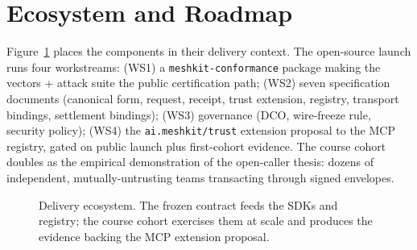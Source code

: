 \documentclass[10pt,twocolumn]{article}
\newcommand{\field}[1]{\texttt{#1}}
\begin{document}
\section{Ecosystem and Roadmap}

Figure~\ref{fig:ecosystem} places the components in their delivery
context. The open-source launch runs four workstreams: (WS1) a
\field{meshkit-conformance} package making the vectors + attack suite the
public certification path; (WS2) seven specification documents (canonical
form, request, receipt, trust extension, registry, transport bindings,
settlement bindings);
(WS3) governance (DCO, wire-freeze rule, security policy); (WS4) the
\field{ai.meshkit/trust} extension proposal to the MCP registry, gated on
public launch plus first-cohort evidence. The course cohort doubles as the
empirical demonstration of the open-caller thesis: dozens of independent,
mutually-untrusting teams transacting through signed envelopes.

\begin{figure}[t]
\centering
{}
\caption{Delivery ecosystem. The frozen contract feeds the SDKs and
registry; the course cohort exercises them at scale and produces the
evidence backing the MCP extension proposal.}
\label{fig:ecosystem}
\end{figure}
\end{document}
